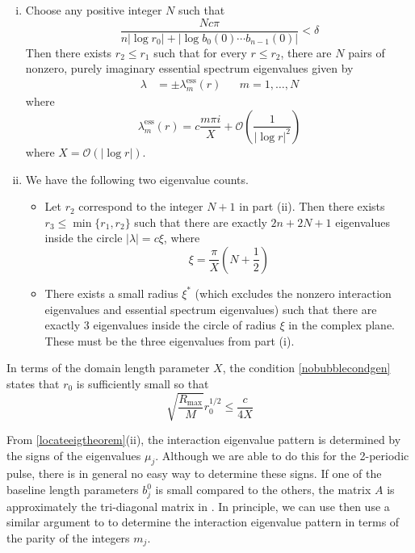 \documentclass[thesis.tex]{subfiles}
\begin{document}
\begin{theorem}
\begin{enumerate}[(i)]
\item Choose any positive integer $N$ such that 
\[
\frac{N c \pi}{n |\log r_0| + |\log b_0(0)\cdots b_{n-1}(0)| } < \delta
\]
Then there exists $r_2 \leq r_1$ such that for every $r \leq r_2$, there are $N$ pairs of nonzero, 	purely imaginary essential spectrum eigenvalues given by 
\begin{align*}
\lambda &= \pm \lambda_m^{\text{ess}}(r) && m = 1, \dots, N
\end{align*}
where
\begin{equation}\label{lambdaess}
\lambda^{\text{ess}}_m(r) = c \frac{m \pi i }{X} + \mathcal{O}\left( \frac{1}{|\log r|^2} \right)
\end{equation}
where $X = \mathcal{O}(|\log r|)$.

\item We have the following two eigenvalue counts.
\begin{itemize}
	\item Let $r_2$ correspond to the integer $N+1$ in part (ii). Then there exists $r_3 \leq \min\{r_1, r_2\}$ such that there are exactly $2n + 2 N + 1$ eigenvalues inside the circle $|\lambda| = c \xi$, where
	\[
	\xi = \frac{\pi}{X}\left( N + \frac{1}{2} \right)
	\]
	\item There exists a small radius $\xi^*$ (which excludes the nonzero interaction eigenvalues and essential spectrum eigenvalues) such that there are exactly 3 eigenvalues inside the circle of radius $\xi$ in the complex plane. These must be the three eigenvalues from part (i).
\end{itemize}
\end{enumerate}

\end{theorem}

\begin{remark}
In terms of the domain length parameter $X$, the condition \cref{nobubblecondgen} states that $r_0$ is sufficiently small so that
\[
\sqrt{\frac{R_{\max}}{M}} r_0^{1/2} \leq \frac{c}{4 X}
\]
\end{remark}

From \cref{locateeigtheorem}(ii), the interaction eigenvalue pattern is determined by the signs of the eigenvalues $\mu_j$. Although we are able to do this for the 2-periodic pulse, there is in general no easy way to determine these signs. If one of the baseline length parameters $b_j^0$ is small compared to the others, the matrix $A$ is approximately the tri-diagonal matrix in \cite[Theorem 2]{Sandstede1998}. In principle, we can use then use a similar argument to \cite[Theorem 3(iv)]{Sandstede1998} to determine the interaction eigenvalue pattern in terms of the parity of the integers $m_j$.
\end{document}
